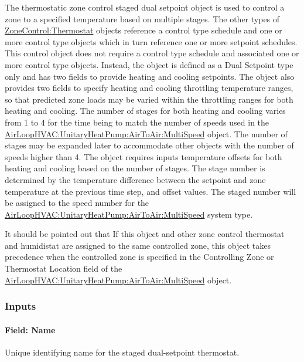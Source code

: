 The thermostatic zone control staged dual setpoint object is used to control a zone to a specified temperature based on multiple stages. The other types of \hyperref[zonecontrolthermostat]{ZoneControl:Thermostat} objects reference a control type schedule and one or more control type objects which in turn reference one or more setpoint schedules. This control object does not require a control type schedule and associated one or more control type objects. Instead, the object is defined as a Dual Setpoint type only and has two fields to provide heating and cooling setpoints. The object also provides two fields to specify heating and cooling throttling temperature ranges, so that predicted zone loads may be varied within the throttling ranges for both heating and cooling. The number of stages for both heating and cooling varies from 1 to 4 for the time being to match the number of speeds used in the \hyperref[airloophvacunitaryheatpumpairtoairmultispeed]{AirLoopHVAC:UnitaryHeatPump:AirToAir:MultiSpeed} object. The number of stages may be expanded later to accommodate other objects with the number of speeds higher than 4. The object requires inputs temperature offsets for both heating and cooling based on the number of stages. The stage number is determined by the temperature difference between the setpoint and zone temperature at the previous time step, and offset values. The staged number will be assigned to the speed number for the \hyperref[airloophvacunitaryheatpumpairtoairmultispeed]{AirLoopHVAC:UnitaryHeatPump:AirToAir:MultiSpeed} system type.

It should be pointed out that If this object and other zone control thermostat and humidistat are assigned to the same controlled zone, this object takes precedence when the controlled zone is specified in the Controlling Zone or Thermostat Location field of the \hyperref[airloophvacunitaryheatpumpairtoairmultispeed]{AirLoopHVAC:UnitaryHeatPump:AirToAir:MultiSpeed} object.

\subsubsection{Inputs}\label{inputs-7-030}

\paragraph{Field: Name}\label{field-name-5-028}

Unique identifying name for the staged dual-setpoint thermostat.

